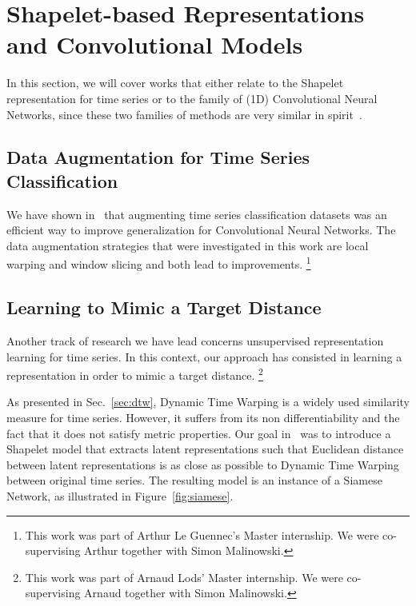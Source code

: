 \section{Shapelet-based Representations and Convolutional Models}
\label{sec:cnn}

In this section, we will cover works that either relate to the Shapelet
representation for time series or to the family of (1D) Convolutional Neural
Networks, since these two families of methods are very similar in
spirit~\cite{lods:hal-01565207}.

\subsection{Data Augmentation for Time Series Classification}

We have shown in~\cite{leguennec:halshs-01357973} that augmenting time
series classification datasets was an efficient way to improve generalization
for Convolutional Neural Networks.
The data augmentation strategies that were investigated in this work are
local warping and window slicing and both lead to improvements.%
\footnote{This work was part of Arthur Le Guennec's Master internship.
We were co-supervising Arthur together with Simon Malinowski.}

\subsection{Learning to Mimic a Target Distance}
\label{sec:siamese}

Another track of research we have lead concerns unsupervised representation
learning for time series.
In this context, our approach has consisted in learning a representation in
order to mimic a target distance.%
\footnote{This work was part of Arnaud Lods' Master internship.
We were co-supervising Arnaud together with Simon Malinowski.}

As presented in Sec.~\ref{sec:dtw}, Dynamic Time Warping is a widely
used similarity measure for time series.
However, it suffers from its non differentiability and the fact that it does
not satisfy metric properties.
Our goal in~\cite{lods:hal-01565207} was to introduce a Shapelet model that
extracts latent representations such that Euclidean distance between latent
representations is as close as possible to Dynamic Time Warping between original
time series.
The resulting model is an instance of a Siamese Network, as illustrated in
Figure~\ref{fig:siamese}.

